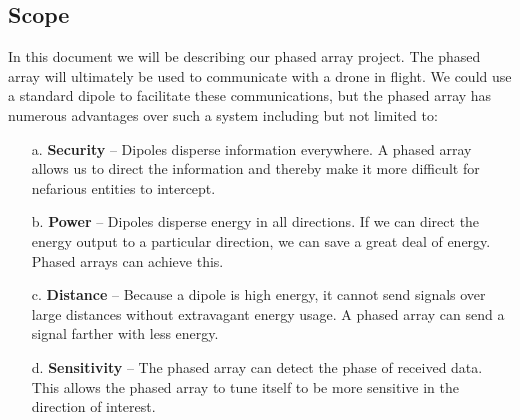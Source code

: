 \documentclass[ProductRequirements.tex]{subfiles}
\begin{document}
	\subsection{Scope}
	In this document we will be describing our phased array project. The phased array will ultimately be used to communicate with a drone in flight. We could use a standard dipole to facilitate these communications, but the phased array has numerous advantages over such a system including but not limited to:
	\begin{itemize} \itemsep1pt
		\item[a.]	\textbf{Security} -- Dipoles disperse information everywhere. A phased array allows us to direct the information and thereby make it more difficult for nefarious entities to intercept.
		\item[b.] 	\textbf{Power} -- Dipoles disperse energy in all directions. If we can direct the energy output to a particular direction, we can save a great deal of energy. Phased arrays can achieve this.
		\item[c.] 	\textbf{Distance} -- Because a dipole is high energy, it cannot send signals over large distances without extravagant energy usage. A phased array can send a signal farther with less energy.
			\item[d.] 	\textbf{Sensitivity} -- The phased array can detect the phase of received data. This allows the phased array to tune itself to be more sensitive in the direction of interest.
	\end{itemize}
\end{document}
